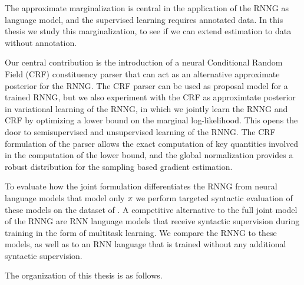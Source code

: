The approximate marginalization is central in the application of the RNNG as language model, and the supervised learning requires annotated data. In this thesis we study this marginalization, to see if we can extend estimation to data without annotation.

Our central contribution is the introduction of a neural Conditional Random Field (CRF) constituency parser that can act as an alternative approximate posterior for the RNNG. The CRF parser can be used as proposal model for a trained RNNG, but we also experiment with the CRF as approximtate posterior in variational learning of the RNNG, in which we jointly learn the RNNG and CRF by optimizing a lower bound on the marginal log-likelihood. This opens the door to semisupervised and unsupervised learning of the RNNG. The CRF formulation of the parser allows the exact computation of key quantities involved in the computation of the lower bound, and the global normalization provides a robust distribution for the sampling based gradient estimation.

To evaluate how the joint formulation differentiates the RNNG from neural language models that model only $x$ we perform targeted syntactic evaluation of these models on the dataset of \citep{linzen2018targeted}. A competitive alternative to the full joint model of the RNNG are RNN language models that receive syntactic supervision during training in the form of multitask learning. We compare the RNNG to these models, as well as to an RNN language that is trained without any additional syntactic supervision.

The organization of this thesis is as follows.

